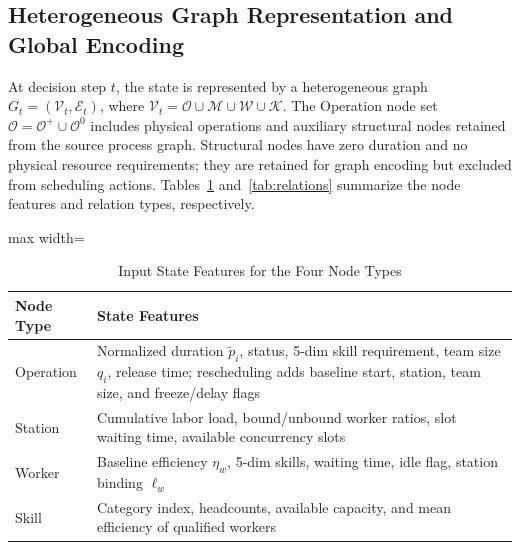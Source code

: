 \documentclass[journal,10pt]{IEEEtran}
\renewcommand{\arraystretch}{1.06}
\begin{document}
\subsection{Heterogeneous Graph Representation and Global Encoding}\label{sec:encoder}

At decision step $t$, the state is represented by a heterogeneous graph $G_t=(\mathcal{V}_t,\mathcal{E}_t)$, where $\mathcal{V}_t=\mathcal{O}\cup\mathcal{M}\cup\mathcal{W}\cup\mathcal{K}$. The Operation node set $\mathcal{O}=\mathcal{O}^+\cup\mathcal{O}^0$ includes physical operations and auxiliary structural nodes retained from the source process graph. Structural nodes have zero duration and no physical resource requirements; they are retained for graph encoding but excluded from scheduling actions. Tables~\ref{tab:node_features} and~\ref{tab:relations} summarize the node features and relation types, respectively.

\begin{table}[!t]
\centering
\caption{Input State Features for the Four Node Types}
\label{tab:node_features}
\setlength{\tabcolsep}{3pt}
\renewcommand{\arraystretch}{1.05}
\begin{adjustbox}{max width=\columnwidth}
\begin{tabular}{@{}lp{6.8cm}@{}}
\toprule
\textbf{Node Type} & \textbf{State Features} \\
\midrule
Operation & Normalized duration $\widetilde p_i$, status, 5-dim skill requirement, team size $q_i$, release time; rescheduling adds baseline start, station, team size, and freeze/delay flags \\
Station & Cumulative labor load, bound/unbound worker ratios, slot waiting time, available concurrency slots \\
Worker & Baseline efficiency $\eta_w$, 5-dim skills, waiting time, idle flag, station binding $\ell_w$ \\
Skill & Category index, headcounts, available capacity, and mean efficiency of qualified workers \\
\bottomrule
\end{tabular}
\end{adjustbox}
\vspace{2pt}
\par{}\par
\end{table}
\end{document}
